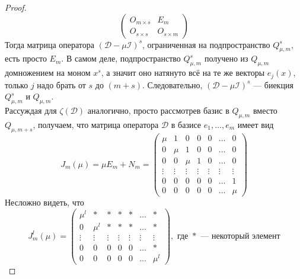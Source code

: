 \documentclass[11pt]{article}
\begin{document}
\begin{proof}
\begin{equation*}
        \left(
        \begin{array}{c|c}
        O_{m \times s} & E_m \\
        \hline
        O_{s \times s} & O_{s \times m}
        \end{array}
        \right)
    \end{equation*}
    Тогда матрица оператора $(\mathcal{D} - \mu \mathcal{I})^s$, ограниченная на подпространство $Q_{\mu, m}^s$, есть просто $E_m$. В самом деле, подпространство $Q_{\mu, m}^s$ получено из $Q_{\mu, m}$ домножением на моном $x^s$, а значит оно натянуто всё на те же векторы $e_j(x)$, только $j$ надо брать от $s$ до $(m + s)$. 
    Следовательно, $(\mathcal{D} - \mu \mathcal{I})^s$ --- биекция $Q_{\mu, m}^s$ и $Q_{\mu, m}$. \\
    Рассуждая для $\zeta(\mathcal{D})$ аналогично, просто рассмотрев базис в $Q_{\mu, m}$ вместо $Q_{\mu, m + s}$, получаем, что матрица
    оператора $\mathcal{D}$ в базисе $e_1, \ldots, e_m$ имеет вид
    \begin{equation*}
        J_m(\mu) = \mu E_m + N_m =
        \begin{pmatrix}
            \mu & 1 & 0 & 0 & 0 & \ldots & 0 \\
            0 & \mu & 1 & 0 & 0 & \ldots & 0 \\
            0 & 0 & \mu & 1 & 0 & \ldots & 0 \\
            \vdots & \vdots & \vdots & \vdots & \vdots & \vdots & \vdots \\
            0 & 0 & 0 & 0 & 0 & \ldots & 1 \\
            0 & 0 & 0 & 0 & 0 & \ldots & \mu
        \end{pmatrix}
    \end{equation*} 
    Несложно видеть, что
    \begin{equation*}
        J_m^l(\mu) = 
        \begin{pmatrix}
            \mu^l & \ast & \ast & \ast & \ast & \ldots & \ast \\
            0 & \mu^l & \ast & \ast & \ast & \ldots & \ast \\
            \vdots & \vdots & \vdots & \vdots & \vdots & \vdots & \vdots \\
            0 & 0 & 0 & 0 & 0 & \ldots & \ast \\
            0 & 0 & 0 & 0 & 0 & \ldots & \mu^l
        \end{pmatrix}
        , \text{ где } \ast \text{ --- некоторый элемент}
    \end{equation*}

\end{proof}
\end{document}
